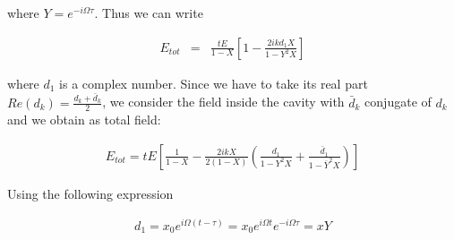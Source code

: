 where $Y=e^{-i\Omega\tau}$. Thus we can write

\begin{align}
E_{tot}&=&\frac{tE}{1-X}\left [1-\frac{2ikd_1 X}{1-Y^2X}\right ]
\end{align}

where $d_1$ is a complex number. Since we have to take its real part $Re (d_k)=\frac{d_k+\bar{d}_k}{2}$,
we consider the field inside the cavity with $\bar{d}_k$ conjugate of $d_k$ and we obtain as total field:%



\begin{align*}
E_{tot}=tE\left [\frac{1}{1-X}- \frac{2ikX}{2(1-X)}   \left ( \frac{d_1}{1-Y^2 X} +\frac{\bar{d}_1}{1-\overline{Y}^2 X}\right )\right]
\end{align*}

%
 
Using the following expression
 
\begin{align}
d_1=x_0e^{i\Omega(t-\tau)}=x_0e^{i\Omega t}e^{-i\Omega\tau}=xY  
\end{align}
 
